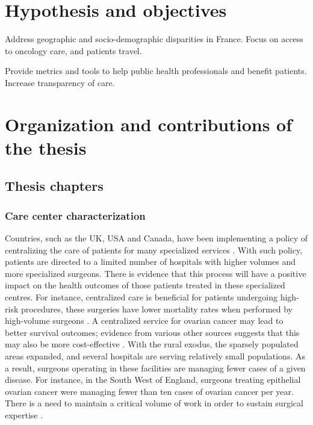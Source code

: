 \section{Hypothesis and objectives}


Address geographic and socio-demographic disparities in France.
Focus on access to oncology care, and patients travel.

Provide metrics and tools to help public health professionals and benefit
patients.
Increase transparency of care.

\section{Organization and contributions of the thesis}

\subsection{Thesis chapters}

\subsubsection{Care center characterization}

Countries, such as the UK, USA and Canada, have been implementing a policy of
centralizing the care of patients for many specialized services
\cite{kelly_are_2016}. With such policy, patients are directed to a limited
number of hospitals with higher volumes and more specialized surgeons. There is
evidence that this process will have a positive impact on the health outcomes of
those patients treated in these specialized centres. For instance, centralized
care is beneficial for patients undergoing high-risk procedures, these surgeries
have lower mortality rates when performed by high-volume surgeons
\cite{pekala_centralization_2021,birkmeyer_surgeon_2003,finks_trends_2011,
    hollenbeck_getting_2007,goossens-laan_systematic_2011}. A centralized service
for ovarian cancer may lead to better survival outcomes; evidence from various
other sources suggests that this may also be more cost-effective
\cite{woo_centralisation_2012}. With the rural exodus, the sparsely populated
areas expanded, and several hospitals are serving relatively small populations.
As a result, surgeons operating in these facilities are managing fewer cases of
a given disease. For instance, in the South West of England, surgeons treating
epithelial ovarian cancer were managing fewer than ten cases of ovarian cancer
per year. There is a need to maintain a critical volume of work in order to
sustain surgical expertise \cite{olaitan_surgical_2001}.

